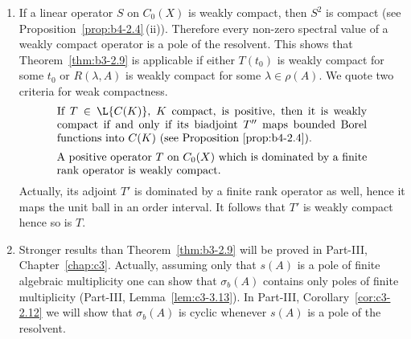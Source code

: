 \begin{remarks}
\begin{enumerate}[\upshape (i), wide, labelindent=.25em]
	We sketch the proof of (a) $\Leftrightarrow$ (b) assuming that $s(A) = 0$.
	If\/ $0$ is a first order pole, then the residue $P$ is a positive projection satisfying $PE = \Kern{A}$, $P'E' = \Kern{A'}$ (see Part-I, Example~\ref{ex:a3-3.6}).
	Thus given $0 < f \in \Kern{A}$ and any $0 \leq \phi \in E'$ such that $\langle f,\phi \rangle > 0$, we have for $\phi \coloneqq P'\phi$: $\langle f,\phi \rangle = \langle f, P'\phi \rangle = \langle Pf,\phi \rangle = \langle f,\phi \rangle > 0$.
	To prove the reverse direction, we first observe that the highest coefficient $Q_{k}$ of the Laurent expansion is a positive operator.
	Thus if\/ $0$ is a pole of order $k \geq 2$, we choose $0 < h \in E$ such that $f \coloneqq Q_{k}h > 0$.
	Then $Af = AQ_{k}h = 0$ and for every $\phi \in \Kern{A'}$ we have $\langle f,\phi \rangle = \langle Q_{k}h,\phi \rangle = \langle h,Q_{k}'\phi \rangle = \langle h,Q_{k-1}'A'\phi \rangle = 0$.
	\item 
	If a linear operator $S$ on $C_{0}(X)$ is weakly compact, then $S^{2}$ is compact (see Proposition~\ref{prop:b4-2.4}\,(ii)).
	Therefore every non-zero spectral value of a weakly compact operator is a pole of the resolvent.
	This shows that Theorem~\ref{thm:b3-2.9} is applicable if either $T(t_{0})$ is weakly compact for some $t_{0}$ or $R(\lambda,A)$ is weakly compact for some $\lambda \in \rho(A)$.
	We quote two criteria for weak compactness.
    \begin{equation}\label{eq:b3-2.31}
		\begin{minipage}{.8\textwidth}
    	If   $T \in \L{C(K)}$, $K$ compact, is positive, then it is weakly compact  	if and only if its biadjoint 	$T''$ maps bounded Borel functions into $C(K)$ (see Proposition~\ref{prop:b4-2.4}).
    	\end{minipage}
	\end{equation}
	\begin{equation}\label{eq:b3-2.32}
        \begin{minipage}{.8\textwidth}
    		A positive operator   $T$ on $C_{0}(X)$ which is dominated by a finite rank 
    		operator is weakly compact. 
    	\end{minipage}
    \end{equation}
    Actually, its adjoint  $T'$ is dominated by a finite rank operator as well, hence it maps the unit ball in an order interval. 
	It follows that $ T' $  is weakly compact hence so is $T$.		
		
	\item 
	Stronger results than Theorem~\ref{thm:b3-2.9} will be proved in Part-III, Chapter~\ref{chap:c3}.
	Actually, assuming only that $s(A)$ is a pole of finite algebraic multiplicity one can show that $\sigma_{b}(A)$ contains only poles of finite multiplicity (Part-III, Lemma~\ref{lem:c3-3.13}).
	In Part-III, Corollary~\ref{cor:c3-2.12} we will show that $\sigma_{b}(A)$ is cyclic whenever $s(A)$ is a pole of the resolvent.
	

\end{enumerate}
\end{remarks}
